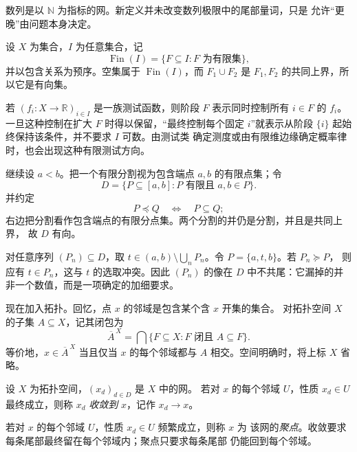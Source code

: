 数列是以 \(\mathbb N\) 为指标的网。新定义并未改变数列极限中的尾部量词，只是
允许“更晚”由问题本身决定。

\begin{example}[有限测试条件形成的方向]
设 \(X\) 为集合，\(I\) 为任意集合，记
\[
 \operatorname{Fin}(I)=\{F\subseteq I:F\text{ 为有限集}\},
\]
并以包含关系为预序。空集属于 \(\operatorname{Fin}(I)\)，而
\(F_1\cup F_2\) 是 \(F_1,F_2\) 的共同上界，所以它是有向集。

若 \((f_i:X\to\mathbb R)_{i\in I}\) 是一族测试函数，则阶段 \(F\) 表示同时控制所有
\(i\in F\) 的 \(f_i\)。一旦这种控制在扩大 \(F\) 时得以保留，“最终控制每个固定
\(i\)”就表示从阶段 \(\{i\}\) 起始终保持该条件，并不要求 \(I\) 可数。由测试类
确定测度或由有限维边缘确定概率律时，也会出现这种有限测试方向。
\end{example}

\begin{example}[任何分割序列都会漏掉一个加细要求]
继续设 \(a<b\)。把一个有限分割视为包含端点 \(a,b\) 的有限点集；令
\[
 D=\{P\subseteq[a,b]:P\text{ 有限且 }a,b\in P\}.
\]
并约定
\[
 P\preceq Q\quad\Longleftrightarrow\quad P\subseteq Q;
\]
右边把分割看作包含端点的有限分点集。两个分割的并仍是分割，并且是共同上界，
故 \(D\) 有向。

对任意序列 \((P_n)\subseteq D\)，取
\(t\in(a,b)\setminus\bigcup_nP_n\)。令 \(P=\{a,t,b\}\)。若 \(P_n\succeq P\)，
则应有 \(t\in P_n\)，这与 \(t\) 的选取冲突。因此 \((P_n)\) 的像在 \(D\)
中不共尾：它漏掉的并非一个数值，而是一项确定的加细要求。
\end{example}

现在加入拓扑。回忆，点 \(x\) 的邻域是包含某个含 \(x\) 开集的集合。
对拓扑空间 \(X\) 的子集 \(A\subseteq X\)，记其闭包为
\[
 \overline A^{\,X}
   =\bigcap\{F\subseteq X:F\text{ 闭且 }A\subseteq F\}.
\]
等价地，\(x\in\overline A^{\,X}\) 当且仅当 \(x\) 的每个邻域都与 \(A\)
相交。空间明确时，将上标 \(X\) 省略。

\begin{definition}[网的收敛与聚点]
设 \(X\) 为拓扑空间，\((x_d)_{d\in D}\) 是 \(X\) 中的网。
若对 \(x\) 的每个邻域 \(U\)，性质 \(x_d\in U\) 最终成立，则称
\(x_d\) \emph{收敛到} \(x\)，记作 \(x_d\to x\)。

若对 \(x\) 的每个邻域 \(U\)，性质 \(x_d\in U\) 频繁成立，则称 \(x\) 为
该网的\emph{聚点}。收敛要求每条尾部最终留在每个邻域内；聚点只要求每条尾部
仍能回到每个邻域。
\end{definition}

